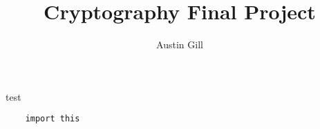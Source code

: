 \documentclass{article}
\author{Austin Gill}
\title{Cryptography Final Project}
\begin{document}
\maketitle

test

\begin{verbatim}
    import this
\end{verbatim}
\end{document}
